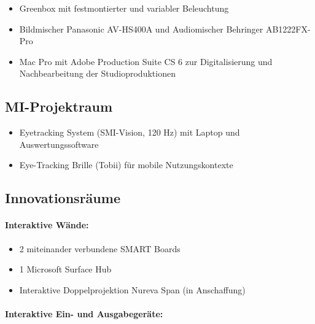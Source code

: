 \begin{itemize}
\tightlist
\item
  Greenbox mit festmontierter und variabler Beleuchtung
\item
  Bildmischer Panasonic AV-HS400A und Audiomischer Behringer
  AB1222FX-Pro
\item
  Mac Pro mit Adobe Production Suite CS 6 zur Digitalisierung und
  Nachbearbeitung der Studioproduktionen
\end{itemize}

\subsection{MI-Projektraum\label{/mi-2017/selbstbericht/0800-ausstattung/0000-ausstattung}}\label{mi-projektraumpathlabelmi-2017selbstbericht0800-ausstattung0000-ausstattung}

\begin{itemize}
\tightlist
\item
  Eyetracking System (SMI-Vision, 120 Hz) mit Laptop und
  Auswertungssoftware
\item
  Eye-Tracking Brille (Tobii) für mobile Nutzungskontexte
\end{itemize}

\subsection{Innovationsräume\label{/mi-2017/selbstbericht/0800-ausstattung/0000-ausstattung}}\label{innovationsruxe4umepathlabelmi-2017selbstbericht0800-ausstattung0000-ausstattung}

\paragraph{Interaktive
Wände:\label{/mi-2017/selbstbericht/0800-ausstattung/0000-ausstattung}}\label{interaktive-wuxe4ndepathlabelmi-2017selbstbericht0800-ausstattung0000-ausstattung}

\begin{itemize}
\tightlist
\item
  2 miteinander verbundene SMART Boards
\item
  1 Microsoft Surface Hub
\item
  Interaktive Doppelprojektion Nureva Span (in Anschaffung)
\end{itemize}

\paragraph{Interaktive Ein- und
Ausgabegeräte:\label{/mi-2017/selbstbericht/0800-ausstattung/0000-ausstattung}}\label{interaktive-ein--und-ausgabegeruxe4tepathlabelmi-2017selbstbericht0800-ausstattung0000-ausstattung}

